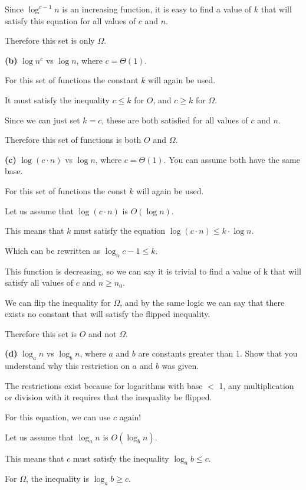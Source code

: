 \documentclass[12pt]{report}
\begin{document}
Since $\log^{c-1}n$ is an increasing function, it is easy to find a value of
$k$ that will satisfy this equation for all values of $c$ and $n$.

Therefore this set is only $\Omega$.

\textbf{(b)} $\log n^c$ vs $\log n$, where $c=\Theta(1)$.

For this set of functions the constant $k$ will again be used.

It must satisfy the inequality $c \leq k$ for $O$, and $c \geq k$ for $\Omega$.

Since we can just set $k = c$, these are both satisfied for all values of $c$ and $n$.

Therefore this set of functions is both $O$ and $\Omega$.

\pagebreak

\textbf{(c)} $\log(c \cdot n)$ vs $\log n$, where $c = \Theta(1)$.
You can assume both have the same base.

For this set of functions the const $k$ will again be used.

Let us assume that $\log(c \cdot n)$ is $O(\log n)$.

This means that $k$ must satisfy the equation $\log(c \cdot n) \leq k \cdot \log n$.

Which can be rewritten as $\log_n c - 1 \leq k$.

This function is decreasing, so we can say it is trivial to find a value of k that will
satisfy all values of $c$ and $n \geq n_0$.

We can flip the inequality for $\Omega$, and by the same logic we can say
that there exists no constant that will satisfy the flipped inequality.

Therefore this set is $O$ and not $\Omega$.

\textbf{(d)} $\log_a n$ vs $\log_b n$, where $a$ and $b$ are constants greater
than 1. Show that you understand why this restriction on $a$ and $b$ was given.

The restrictions exist because for logarithms with base $<$ 1, any
multiplication or division with it requires that the inequality be
flipped.

For this equation, we can use $c$ again!

Let us assume that $\log_a n$ is $O(\log_b n)$.

This means that $c$ must satisfy the inequality $\log_a b \leq c$.

For $\Omega$, the inequality is $\log_a b \geq c$.
\end{document}

